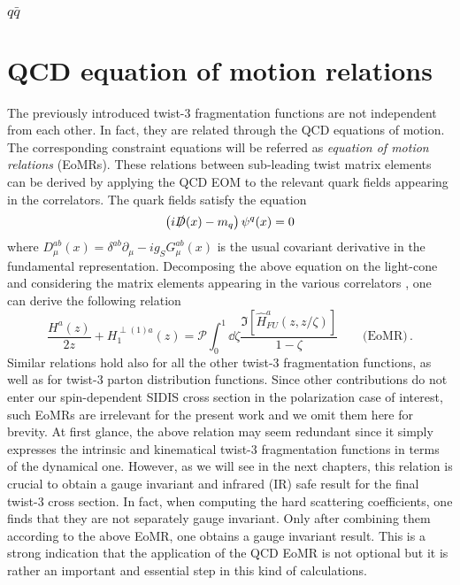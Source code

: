 \subsubsection*{$q \bar q$}
\section{QCD equation of motion relations}
The previously introduced twist-3 fragmentation functions are not independent from each other. In fact, they are related through the QCD equations of motion. The corresponding constraint equations will be referred as \textit{equation of motion relations} (EoMRs). These relations between sub-leading twist matrix elements can be derived by applying the QCD EOM to the relevant quark fields appearing in the correlators. The quark fields satisfy the equation
\begin{equation}
    \left(i \slashed{D}(x) -m_q \right)\psi^q(x)=0
\end{equation}
where $D_\mu^{ab}(x)=\delta^{ab}\partial_\mu -ig_S G_\mu^{ab}(x)$ is the usual covariant derivative in the fundamental representation. Decomposing the above equation on the light-cone and considering the matrix elements appearing in the various correlators \cite{bacchetta_semi-inclusive_2007}, one can derive the following relation \cite{kanazawa_operator_2016}
\begin{equation}
    \frac{H^a(z)}{2 z}+H_1^{\perp(1)a}(z)= \mathcal{P}\int_0^1\dd \zeta\frac{\Im[\hat H^a_{FU}(z,z/\zeta)]}{1-\zeta}\qquad \text{(EoMR)}\,.
\end{equation}
Similar relations hold also for all the other twist-3 fragmentation functions, as well as for twist-3 parton distribution functions. Since other contributions do not enter our spin-dependent SIDIS cross section in the polarization case of interest, such EoMRs are irrelevant for the present work and we omit them here for brevity. At first glance, the above relation may seem redundant since it simply expresses the intrinsic and kinematical twist-3 fragmentation functions in terms of the dynamical one. However, as we will see in the next chapters, this relation is crucial to obtain a gauge invariant and infrared (IR) safe result for the final twist-3 cross section. In fact, when computing the hard scattering coefficients, one finds that they are not separately gauge invariant. Only after combining them according to the above EoMR, one obtains a gauge invariant result. This is a strong indication that the application of the QCD EoMR is not optional but it is rather an important and essential step in this kind of calculations.

